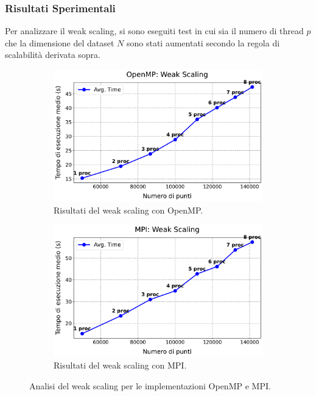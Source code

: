 \documentclass[letterpaper,11pt,leqno]{article}
\begin{document}
\subsubsection{Risultati Sperimentali}
Per analizzare il weak scaling, si sono eseguiti test in cui sia il numero di thread \( p \) che la dimensione del dataset \( N \) sono stati aumentati secondo la regola di scalabilità derivata sopra.

\begin{figure}[h]
    \centering
    \begin{subfigure}{0.48\textwidth}
        \centering
        \includegraphics[scale=0.3]{graphs/omp_weak_scaling.pdf}
        \caption{Risultati del weak scaling con OpenMP.}
        \label{f:weak_scaling_omp}
    \end{subfigure}
    \hfill
    \begin{subfigure}{0.48\textwidth}
        \centering
        \includegraphics[scale=0.3]{graphs/mpi_weak_scaling.pdf}
        \caption{Risultati del weak scaling con MPI.}
        \label{f:weak_scaling_mpi}
    \end{subfigure}
    \caption{Analisi del weak scaling per le implementazioni OpenMP e MPI.}
    \label{f:weak_scaling_graphs}
\end{figure}
\end{document}
